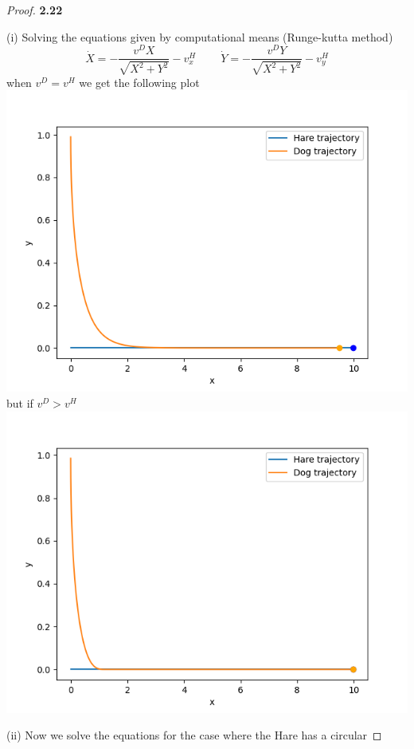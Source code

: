 \documentclass[11pt]{article}
\begin{document}
    \begin{proof}{\textbf{2.22}}
        \item[(i)]
        Solving the equations given by computational means (Runge-kutta method)
        $$\dot{X} = -\frac{v^D X}{\sqrt{X^2 + Y^2}} - v^H_x \quad \quad \ 
          \dot{Y} = -\frac{v^D Y}{\sqrt{X^2 + Y^2}} - v^H_y$$
        when $v^D = v^H$ we get the following plot\\
        \includegraphics{gregory-2.22-1_vd=vh.png}
\cleardoublepage
        but if $v^D > v^H$\\
        \includegraphics{gregory-2.22-1_vd>vh.png}
\cleardoublepage        
        \item[(ii)]
        Now we solve the equations for the case where the Hare has a circular

\end{proof}
\end{document}
